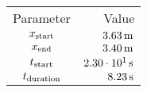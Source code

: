 \begin{tabular}{cr}
    \toprule
    Parameter & Value \\ \otoprule
    $x_{\textup{start}}$    & $\unit[3.63]{m}$ \\
    $x_{\textup{end}}$      & $\unit[3.40]{m}$ \\
    $t_{\textup{start}}$    & $\unit[2.30 \cdot 10^{1}]{s}$ \\
    $t_{\textup{duration}}$ & $\unit[8.23]{s}$ \\
    \bottomrule
\end{tabular}
